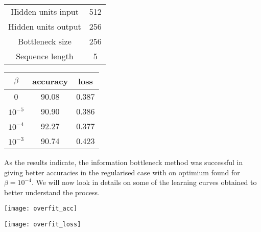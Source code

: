 \documentclass[11pt,oneside,openright]{report}
\begin{document}
\begin{minipage}{0.35\textwidth}
        \centering
\begin{tabular}{ c | c  }
 Hidden units input & 512 \\
 Hidden units output & 256 \\
 Bottleneck size & 256 \\
 Sequence length & 5 \\
\end{tabular}
    \end{minipage}\hfill
    \begin{minipage}{0.8\textwidth}
        \centering
\begin{tabular}{ c | c c }
 $\beta$ & accuracy & loss \\
 \hline
0  & 90.08 & 0.387 \\
$10^{-5}$  & 90.90 & 0.386 \\
$10^{-4}$  & 92.27 & 0.377 \\
$10^{-3}$  & 90.74 & 0.423 \\
\end{tabular}
    \end{minipage}

\begin{center}
\end{center}

As the results indicate, the information bottleneck method was successful in giving better accuracies in the regularised case with on optimium found for $\beta = 10^{-4}$. We will now look in details on some of the learning curves obtained to better understand the process.

\begin{center}
\vspace{1.0cm}
\begin{minipage}{0.5\textwidth}
        \centering
\texttt{[image: overfit\_acc]}
    \end{minipage}\hfill
    \begin{minipage}{0.5\textwidth}
        \centering
\texttt{[image: overfit\_loss]}
    \end{minipage}
\label{fig:overfit}
\vspace{1.0cm}
\end{center}
\end{document}

